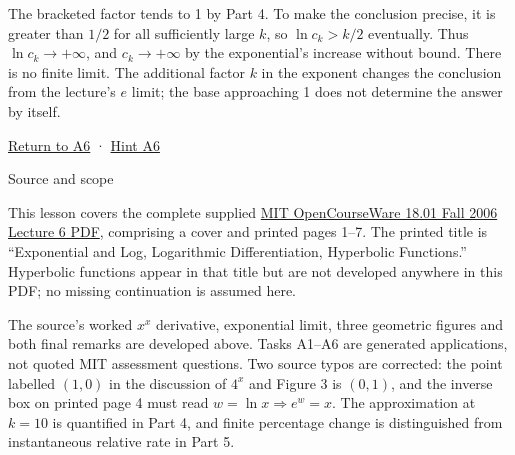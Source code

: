 \documentclass[
  11pt,
]{article}
\begin{document}
The bracketed factor tends to 1 by Part 4. To make the conclusion
precise, it is greater than \(1/2\) for all sufficiently large \(k\), so
\(\ln c_k>k/2\) eventually. Thus \(\ln c_k\to+\infty\), and
\(c_k\to+\infty\) by the exponential's increase without bound. There is
no finite limit. The additional factor \(k\) in the exponent changes the
conclusion from the lecture's \(e\) limit; the base approaching 1 does
not determine the answer by itself.

\protect\hyperlink{task-a6}{Return to A6} ·
\protect\hyperlink{hint-a6}{Hint A6}

Source and scope

This lesson covers the complete supplied
\href{https://ocw.mit.edu/courses/18-01-single-variable-calculus-fall-2006/f9af0e98490296c99d330faf47389507_lec6.pdf}{MIT
OpenCourseWare 18.01 Fall 2006 Lecture 6 PDF}, comprising a cover and
printed pages 1--7. The printed title is ``Exponential and Log,
Logarithmic Differentiation, Hyperbolic Functions.'' Hyperbolic
functions appear in that title but are not developed anywhere in this
PDF; no missing continuation is assumed here.

The source's worked \(x^x\) derivative, exponential limit, three
geometric figures and both final remarks are developed above. Tasks
A1--A6 are generated applications, not quoted MIT assessment questions.
Two source typos are corrected: the point labelled \((1,0)\) in the
discussion of \(4^x\) and Figure 3 is \((0,1)\), and the inverse box on
printed page 4 must read \(w=\ln x\Rightarrow e^w=x\). The approximation
at \(k=10\) is quantified in Part 4, and finite percentage change is
distinguished from instantaneous relative rate in Part 5.
\end{document}
